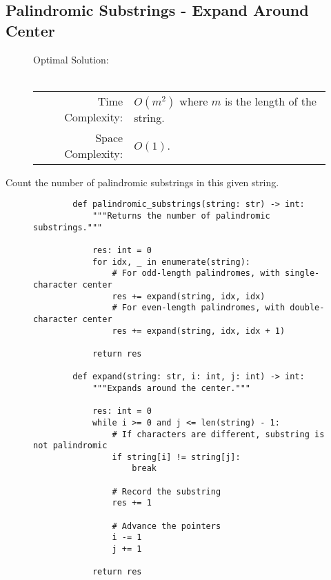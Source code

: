 
\subsection{Palindromic Substrings - Expand Around Center}

\begin{figure}[H]
    Optimal Solution:\\\\
    \begin{tabular}{rl}
        Time Complexity:& \(O(m^2)\) where \(m\) is the length of the string.\\
        Space Complexity:& \(O(1)\).
    \end{tabular}
\end{figure}

Count the number of palindromic substrings in this given string.

\begin{figure}[H]
    \centering
    \begin{verbatim}
        def palindromic_substrings(string: str) -> int:
            """Returns the number of palindromic substrings."""

            res: int = 0
            for idx, _ in enumerate(string):
                # For odd-length palindromes, with single-character center
                res += expand(string, idx, idx)
                # For even-length palindromes, with double-character center
                res += expand(string, idx, idx + 1)

            return res

        def expand(string: str, i: int, j: int) -> int:
            """Expands around the center."""

            res: int = 0
            while i >= 0 and j <= len(string) - 1:
                # If characters are different, substring is not palindromic
                if string[i] != string[j]:
                    break

                # Record the substring
                res += 1

                # Advance the pointers
                i -= 1
                j += 1

            return res
    \end{verbatim}
\end{figure}
